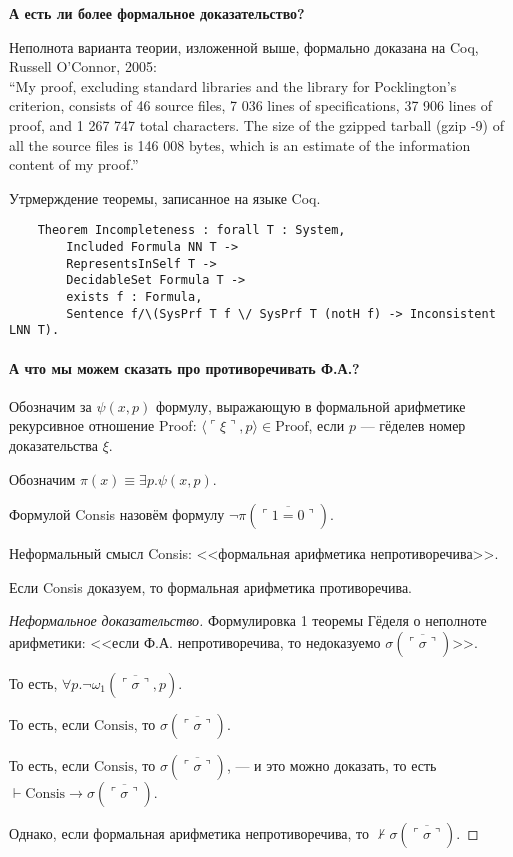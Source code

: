 \textbf{А есть ли более формальное доказательство?}

Неполнота варианта теории, изложенной выше, формально доказана на Coq, Russell O'Connor, 2005:\\
``My proof, excluding standard libraries and the library for Pocklington’s criterion,
consists of 46 source files, 7 036 lines of specifications, 37 906 lines of proof,
and 1 267 747 total characters. The size of the gzipped tarball (gzip -9) of all
the source files is 146 008 bytes, which is an estimate of the information content of my proof.''

Утрмерждение теоремы, записанное на языке Coq.
\begin{verbatim}
    Theorem Incompleteness : forall T : System,
        Included Formula NN T ->
        RepresentsInSelf T ->
        DecidableSet Formula T ->
        exists f : Formula,
        Sentence f/\(SysPrf T f \/ SysPrf T (notH f) -> Inconsistent LNN T).
\end{verbatim}

\paragraph{А что мы можем сказать про противоречивать Ф.А.?}

\begin{definition}
Обозначим за $\psi(x,p)$ формулу, выражающую в формальной арифметике рекурсивное
отношение Proof: $\langle \ulcorner\xi\urcorner,p\rangle \in \text{Proof}$, если $p$ --- гёделев номер
доказательства $\xi$.

Обозначим $\pi(x)\equiv\exists p.\psi(x,p)$.
\end{definition}
\begin{definition}
    Формулой Consis назовём формулу $\neg \pi(\overline{\ulcorner 1=0 \urcorner})$.
\end{definition}
\begin{note}
    Неформальный смысл Consis: <<формальная арифметика непротиворечива>>.
\end{note}

\begin{theorem}
    Если Consis доказуем, то формальная арифметика противоречива.
\end{theorem}
\begin{proof}[Неформальное доказательство]

    Формулировка 1 теоремы Гёделя о неполноте арифметики:
<<если Ф.А. непротиворечива, то недоказуемо $\sigma(\overline{\ulcorner\sigma\urcorner})$>>.

То есть, $\forall p.\neg\omega_1(\overline{\ulcorner\sigma\urcorner},p)$.

То есть,
если $\text{Consis}$, то $\sigma(\overline{\ulcorner\sigma\urcorner})$.

То есть, если $\text{Consis}$, то $\sigma(\overline{\ulcorner\sigma\urcorner})$, --- и это можно доказать,
то есть $\vdash\text{Consis}\rightarrow\sigma(\overline{\ulcorner\sigma\urcorner})$.

Однако, если формальная арифметика непротиворечива, то $\not\vdash\sigma(\overline{\ulcorner\sigma\urcorner})$.
\end{proof}


